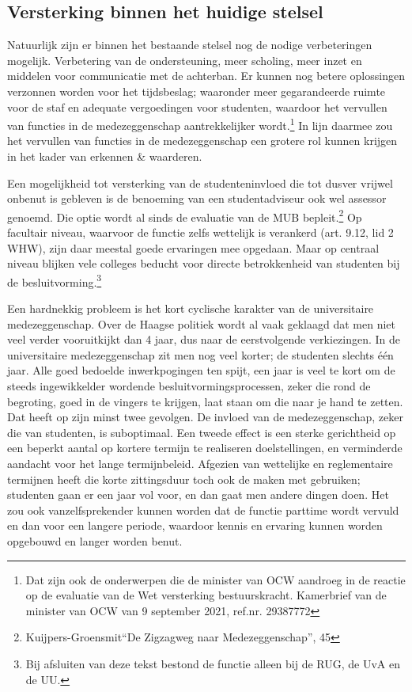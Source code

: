 \documentclass{jote-book}
\begin{document}
	\subsection{Versterking binnen het huidige stelsel }



	Natuurlijk zijn er binnen het bestaande stelsel nog de nodige verbeteringen mogelijk. Verbetering van de ondersteuning, meer scholing, meer inzet en middelen voor communicatie met de achterban. Er kunnen nog betere oplossingen verzonnen worden voor het tijdsbeslag; waaronder meer gegarandeerde ruimte voor de staf en adequate vergoedingen voor studenten, waardoor het vervullen van functies in de medezeggenschap aantrekkelijker wordt.\footnote{Dat zijn ook de onderwerpen die de minister van OCW aandroeg in de reactie op de evaluatie van de Wet versterking bestuurskracht. Kamerbrief van de minister van OCW van 9 september 2021, ref.nr. 29387772} In lijn daarmee zou het vervullen van functies in de medezeggenschap een grotere rol kunnen krijgen in het kader van erkennen \& waarderen.



	Een mogelijkheid tot versterking van de studenteninvloed die tot dusver vrijwel onbenut is gebleven is de benoeming van een studentadviseur ook wel assessor genoemd. Die optie wordt al sinds de evaluatie van de MUB bepleit.\footnote{Kuijpers-Groensmit“De Zigzagweg naar Medezeggenschap”, 45} Op facultair niveau, waarvoor de functie zelfs wettelijk is verankerd (art. 9.12, lid 2 WHW), zijn daar meestal goede ervaringen mee opgedaan. Maar op centraal niveau blijken vele colleges beducht voor directe betrokkenheid van studenten bij de besluitvorming.\footnote{Bij afsluiten van deze tekst bestond de functie alleen bij de RUG, de UvA en de UU.}



	Een hardnekkig probleem is het kort cyclische karakter van de universitaire medezeggenschap. Over de Haagse politiek wordt al vaak geklaagd dat men niet veel verder vooruitkijkt dan 4 jaar, dus naar de eerstvolgende verkiezingen. In de universitaire medezeggenschap zit men nog veel korter; de studenten slechts één jaar. Alle goed bedoelde inwerkpogingen ten spijt, een jaar is veel te kort om de steeds ingewikkelder wordende besluitvormingsprocessen, zeker die rond de begroting, goed in de vingers te krijgen, laat staan om die naar je hand te zetten. Dat heeft op zijn minst twee gevolgen. De invloed van de medezeggenschap, zeker die van studenten, is suboptimaal. Een tweede effect is een sterke gerichtheid op een beperkt aantal op kortere termijn te realiseren doelstellingen, en verminderde aandacht voor het lange termijnbeleid. Afgezien van wettelijke en reglementaire termijnen heeft die korte zittingsduur toch ook de maken met gebruiken; studenten gaan er een jaar vol voor, en dan gaat men andere dingen doen. Het zou ook vanzelfsprekender kunnen worden dat de functie parttime wordt vervuld en dan voor een langere periode, waardoor kennis en ervaring kunnen worden opgebouwd en langer worden benut.
\end{document}
